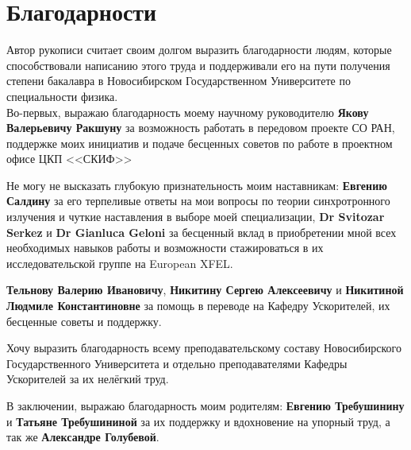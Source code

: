 \chapter*{Благодарности}
Автор рукописи считает своим долгом выразить благодарности людям, которые способствовали написанию этого труда и поддерживали его на пути получения степени бакалавра в Новосибирском Государственном Университете по специальности физика.\\

Во-первых, выражаю благодарность моему научному руководителю \textbf{Якову Валерьевичу Ракшуну} за возможность работать в передовом проекте СО РАН, поддержке моих инициатив и подаче бесценных советов по работе в проектном офисе ЦКП <<СКИФ>>

Не могу не высказать глубокую признательность моим наставникам: \textbf{Евгению Салдину} за его терпеливые ответы на мои вопросы по теории синхротронного излучения и чуткие наставления в выборе моей специализации, \textbf{Dr Svitozar Serkez} и \textbf{Dr Gianluca Geloni} за бесценный вклад в приобретении мной всех необходимых навыков работы и возможности стажироваться в их исследовательской группе на European XFEL.

\textbf{Тельнову Валерию Ивановичу}, \textbf{Никитину Сергею Алексеевичу} и \textbf{Никитиной Людмиле Константиновне} за помощь в переводе на Кафедру Ускорителей, их бесценные советы и поддержку.

Хочу выразить благодарность всему преподавательскому составу Новосибирского Государственного Университета и отдельно преподавателями Кафедры Ускорителей за их нелёгкий труд.

В заключении, выражаю благодарность моим родителям: \textbf{Евгению Требушинину} и \textbf{Татьяне Требушининой} за их поддержку и вдохновение на упорный труд, а так же \textbf{Александре Голубевой}.